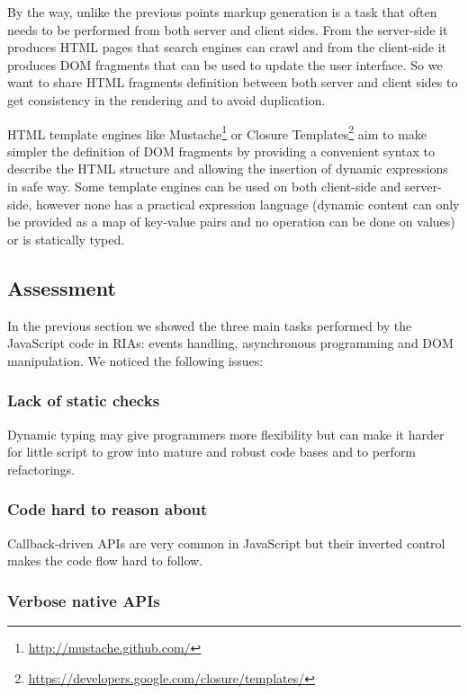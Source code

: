 \documentclass[american,english,runningheads]{llncs}
\begin{document}
By the way, unlike the previous points markup generation is a task that often needs to be performed from both server and client sides. From the server-side it produces HTML pages that search engines can crawl and from the client-side it produces DOM fragments that can be used to update the user interface. So we want to share HTML fragments definition between both server and client sides to get consistency in the rendering and to avoid duplication.

HTML template engines like Mustache\footnote{\href{http://mustache.github.com/}{http://mustache.github.com/}} or Closure Templates\footnote{\href{https://developers.google.com/closure/templates/}{https://developers.google.com/closure/templates/}} aim to make simpler the definition of DOM fragments by providing a convenient syntax to describe the HTML structure and allowing the insertion of dynamic expressions in safe way. Some template engines can be used on both client-side and server-side, however none has a practical expression language (dynamic content can only be provided as a map of key-value pairs and no operation can be done on values) or is statically typed.

\subsection{Assessment}

In the previous section we showed the three main tasks performed by the JavaScript code in RIAs: events handling, asynchronous programming and DOM manipulation. We noticed the following issues:

\subsubsection{Lack of static checks}

Dynamic typing may give programmers more flexibility but can make it harder for little script to grow into mature and robust code bases and to perform refactorings.

\subsubsection{Code hard to reason about}

Callback-driven APIs are very common in JavaScript but their inverted control makes the code flow hard to follow.

\subsubsection{Verbose native APIs}
\end{document}
